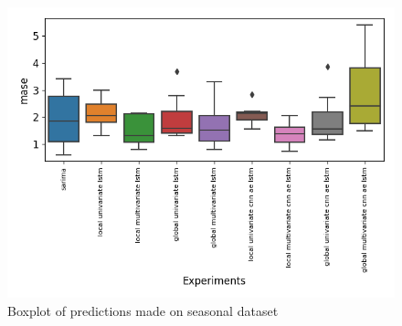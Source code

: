 \begin{figure}[h!]
  \centering
  \includegraphics[width=\textwidth]{./figs/results/boxplot/mase-dataset_seasonal.png}
  \hfill
  \caption{Boxplot of predictions made on seasonal dataset}
  \label{fig:results:boxplot-mase-dataset-2}
\end{figure}

